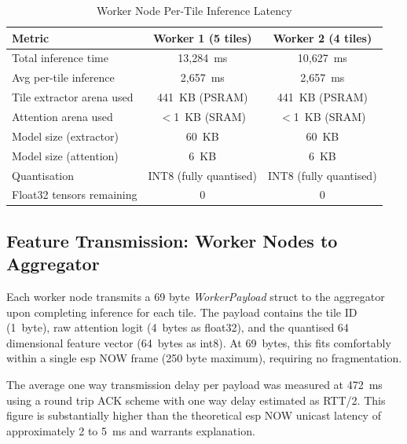 \begin{table}[H]
\renewcommand{\arraystretch}{1.25}
\caption{Worker Node Per-Tile Inference Latency}
\label{tab:worker_inference}
\centering
\begin{tabular}{lcc}
\toprule
\textbf{Metric}               & \textbf{Worker 1 (5 tiles)} & \textbf{Worker 2 (4 tiles)} \\
\midrule
Total inference time          & 13,284~ms                   & 10,627~ms                   \\
Avg per-tile inference        & 2,657~ms                    & 2,657~ms                    \\
Tile extractor arena used     & 441~KB (PSRAM)              & 441~KB (PSRAM)              \\
Attention arena used          & $<$1~KB (SRAM)              & $<$1~KB (SRAM)              \\
Model size (extractor)        & 60~KB                       & 60~KB                       \\
Model size (attention)        & 6~KB                        & 6~KB                        \\
Quantisation                  & INT8 (fully quantised)      & INT8 (fully quantised)      \\
Float32 tensors remaining     & 0                           & 0                           \\
\bottomrule
\end{tabular}
\end{table}
 
\subsection{Feature Transmission: Worker Nodes to Aggregator}
 
Each worker node transmits a 69 byte \textit{WorkerPayload} struct to the aggregator
upon completing inference for each tile. The payload contains the tile ID (1~byte), raw
attention logit (4~bytes as float32), and the quantised 64 dimensional feature vector
(64~bytes as int8). At 69~bytes, this fits comfortably within a single \gls{esp} NOW
frame (250 byte maximum), requiring no fragmentation.
 
The average one way transmission delay per payload was measured at 472~ms using a
round trip ACK scheme with one way delay estimated as RTT/2. This figure is
substantially higher than the theoretical \gls{esp} NOW unicast latency of approximately
2 to 5~ms and warrants explanation.
 
